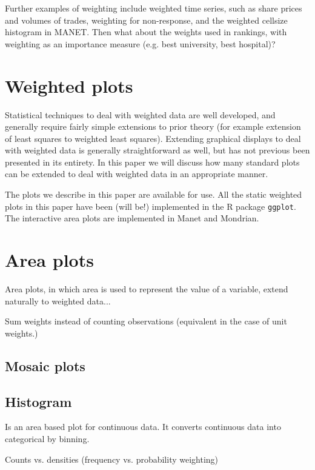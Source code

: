 \documentclass[oneside,letterpaper]{scrartcl}
\begin{document}
Further examples of weighting include weighted time series, such as
share prices and volumes of trades, weighting for non-response, and
the weighted cellsize histogram in MANET.  Then what about the
weights used in rankings, with weighting as an importance measure
(e.g. best university, best hospital)?

\section{Weighted plots}\label{sec:weighted_plots}

Statistical techniques to deal with weighted data are well developed, and generally require fairly simple extensions to prior theory (for example extension of least squares to weighted least squares).  Extending graphical displays to deal with weighted data is generally straightforward as well, but has not previous been presented in its entirety.  In this paper we will discuss how many standard plots can be extended to deal with weighted data in an appropriate manner.  

The plots we describe in this paper are available for use.  All the static weighted plots in this paper have been (will be!) implemented in the R package {\tt ggplot}.  The interactive area plots are implemented in Manet and Mondrian.

\section{Area plots}\label{sec:area_plots}

Area plots, in which area is used to represent the value of a variable, extend naturally to weighted data...

Sum weights instead of counting observations (equivalent in the case of unit weights.)

\subsection{Mosaic plots}\label{sub:mosaic_plots}

\subsection{Histogram}\label{sub:histogram}

Is an area based plot for continuous data.  It converts continuous data into categorical by binning.  
 
Counts vs. densities (frequency vs. probability weighting)
\end{document}
